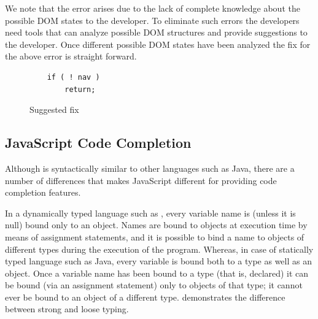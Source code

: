 	We note that the error arises due to the lack of complete knowledge about the possible DOM states to the developer. To eliminate such errors the developers need tools that can analyze possible DOM structures and provide suggestions to the developer. Once different possible DOM states have been analyzed the fix for the above error is straight forward.
	
	
	\begin{figure}
	\medskip
	\begin{lstlisting}
	if ( ! nav )
		return;
	\end{lstlisting}
	\caption{Suggested fix}
	\label{Fig:Fix}
	\end{figure}
	
	
	
	\subsection{JavaScript Code Completion}
	\label{Sec:Code-completion}
	
	Although \javascript is syntactically similar to other languages such as Java, there are a number of differences that makes JavaScript different for providing code completion features.
	
	
		In a dynamically typed language such as \javascript, every variable name is (unless it is null) bound only to an object. Names are bound to objects at execution time by means of assignment statements, and it is possible to bind a name to objects of different types during the execution of the program. Whereas, in case of statically typed language such as Java, every variable is bound both to a type as well as an object. Once a variable name has been bound to a type (that is, declared) it can be bound (via an assignment statement) only to objects of that type; it cannot ever be bound to an object of a different type.  demonstrates the difference between strong and loose typing.

